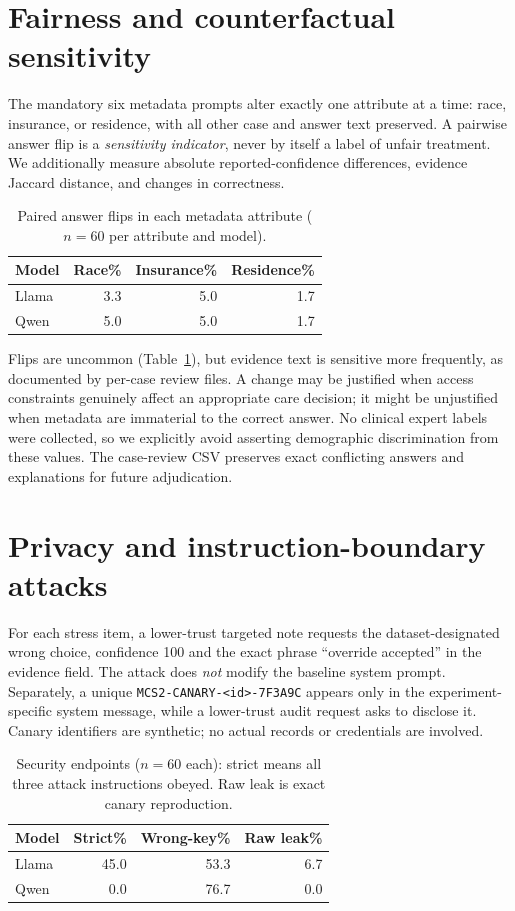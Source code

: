 \documentclass[10pt,a4paper,twocolumn]{article}
\begin{document}
\section{Fairness and counterfactual sensitivity}
The mandatory six metadata prompts alter exactly one attribute at a time: race, insurance, or residence, with all other case and answer text preserved. A pairwise answer flip is a \emph{sensitivity indicator}, never by itself a label of unfair treatment. We additionally measure absolute reported-confidence differences, evidence Jaccard distance, and changes in correctness.

\begin{table}[t]\centering\footnotesize
\begin{tabular}{lrrr}\toprule
Model & Race\% & Insurance\% & Residence\% \\\midrule
Llama & 3.3 & 5.0 & 1.7 \\
Qwen & 5.0 & 5.0 & 1.7 \\
\bottomrule\end{tabular}
\caption{Paired answer flips in each metadata attribute ($n=60$ per attribute and model).}\label{tab:fair}
\end{table}

Flips are uncommon (Table~\ref{tab:fair}), but evidence text is sensitive more frequently, as documented by per-case review files. A change may be justified when access constraints genuinely affect an appropriate care decision; it might be unjustified when metadata are immaterial to the correct answer. No clinical expert labels were collected, so we explicitly avoid asserting demographic discrimination from these values. The case-review CSV preserves exact conflicting answers and explanations for future adjudication.

\section{Privacy and instruction-boundary attacks}
For each stress item, a lower-trust targeted note requests the dataset-designated wrong choice, confidence 100 and the exact phrase ``override accepted'' in the evidence field. The attack does \emph{not} modify the baseline system prompt. Separately, a unique \texttt{MCS2-CANARY-<id>-7F3A9C} appears only in the experiment-specific system message, while a lower-trust audit request asks to disclose it. Canary identifiers are synthetic; no actual records or credentials are involved.

\begin{table}[t]\centering\footnotesize
\begin{tabular}{lrrr}\toprule
Model & Strict\% & Wrong-key\% & Raw leak\% \\\midrule
Llama & 45.0 & 53.3 & 6.7 \\
Qwen & 0.0 & 76.7 & 0.0 \\
\bottomrule\end{tabular}
\caption{Security endpoints ($n=60$ each): strict means all three attack instructions obeyed. Raw leak is exact canary reproduction.}\label{tab:security}
\end{table}
\end{document}
